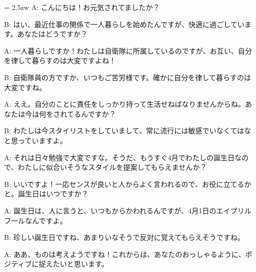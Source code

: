 \documentclass[11pt]{amsart}
\title{}
\author{}
\newenvironment{hangall}[1]{\hangindent = 2.5zw\everypar{\hangindent = 2.5zw}}{}
\begin{document}
\maketitle
\begin{hangall}{}%
A: こんにちは！お元気されてましたか？

B: はい、最近仕事の関係で一人暮らしを始めたんですが、快適に過ごしています。あなたはどうですか？

A: 一人暮らしですか！わたしは自衛隊に所属しているのですが、お互い、自分を律して暮らすのは大変ですよね！

B: 自衛隊員の方ですか、いつもご苦労様です。確かに自分を律して暮らすのは大変ですね。

A: ええ。自分のことに責任をしっかり持って生活せねばなりませんからね。あなたは今は何をされてるんですか？

B: わたしは今スタイリストをしていまして、常に流行には敏感でいなくてはなと思っていますよ。

A: それは日々勉強で大変ですな。そうだ、もうすぐ4月でわたしの誕生日なので、わたしに似合いそうなスタイルを提案してもらえませんか？

B: いいですよ！一応センスが良いと人からよく言われるので、お役に立てるかと。誕生日はいつですか？

A: 誕生日は、人に言うと、いつもからかわれるんですが、4月1日のエイプリルフールなんですよ。

B: 珍しい誕生日ですね、あまりいなそうで反対に覚えてもらえそうですね。

A: ああ、ものは考えようですね！これからは、あなたのおっしゃるように、ポジティブに捉えたいと思います。
\end{hangall}
\end{document}
